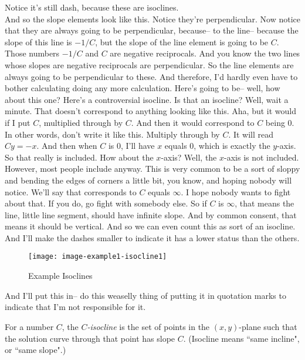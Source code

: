 Notice it's still dash, because these are isoclines.\\
And so the slope elements look like this. Notice they're perpendicular.
Now notice that they are always going to be perpendicular,
because--
to the line-- because the slope of this line is $-1/C$,
but the slope of the line element is going to be $C$.
Those numbers $-1/C$ and $C$ are negative reciprocals.
And you know the two lines whose slopes are negative reciprocals are perpendicular.
So the line elements are always going to be perpendicular to these.
And therefore, I'd hardly even have to bother calculating doing any more calculation.
Here's going to be--
well, how about this one?
Here's a controversial isocline.
Is that an isocline?
Well, wait a minute.
That doesn't correspond to anything looking like this.
Aha, but it would if I put $C$, multiplied through by $C$.
And then it would correspond to $C$ being $0$.
In other words, don't write it like this.
Multiply through by $C$. It will read $Cy = - x$.
And then when $C$ is $0$, I'll have $x$ equals $0$, which is exactly the $y$-axis.
So that really is included.
How about the $x$-axis?
Well, the $x$-axis is not included.
However, most people include anyway.
This is very common to be a sort of sloppy and bending the edges of corners a little bit, you know,
and hoping nobody will notice.
We'll say that corresponds to $C$ equals $\infty$.
I hope nobody wants to fight about that.
If you do, go fight with somebody else.
So if $C$ is $\infty$, that means the line, little line segment,
should have infinite slope.
And by common consent, that means it should be vertical.
And so we can even count this as sort of an isocline.
And I'll make the dashes smaller to indicate it has
a lower status than the others.

\begin{figure}[ht!]
  \centering
  \texttt{[image: image-example1-isocline1]}
  \caption{Example Isoclines}
\end{figure}

And I'll put this in--
do this weaselly thing of putting it in quotation marks
to indicate that I'm not responsible for it.

\clearpage

\begin{definition}
  For a number $C$, the \emph{\color{blue}$C$-isocline} is the set of points
  in the $(x,y)$-plane such that the solution curve through that point has slope $C$.
  (Isocline means “same incline", or “same slope".)
\end{definition}

